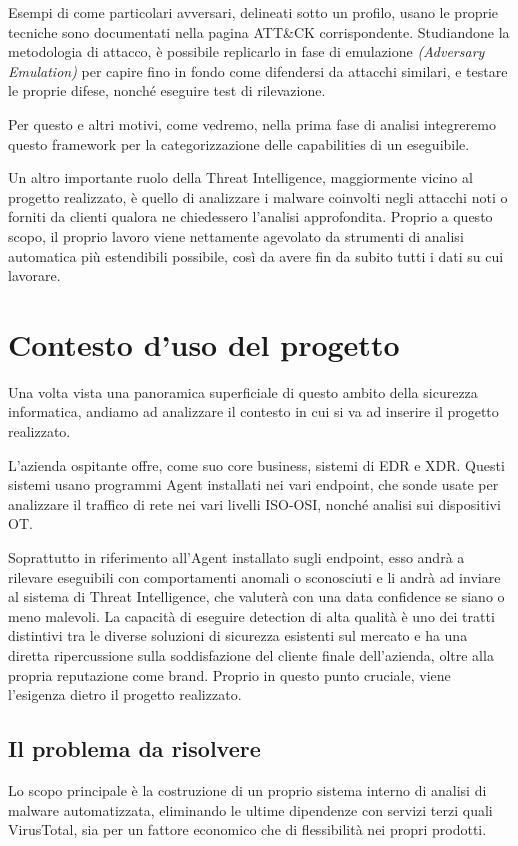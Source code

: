 Esempi di come particolari avversari, delineati sotto un profilo, usano le proprie tecniche sono documentati nella pagina ATT\&CK corrispondente.
Studiandone la metodologia di attacco, è possibile replicarlo in fase di emulazione \emph{(Adversary Emulation)} per capire fino in fondo come difendersi da attacchi similari, e testare le proprie difese, nonché eseguire test di rilevazione.

Per questo e altri motivi, come vedremo, nella prima fase di analisi integreremo questo framework per la categorizzazione delle capabilities di un eseguibile.

\medskip

Un altro importante ruolo della Threat Intelligence, maggiormente vicino al progetto realizzato, è quello di analizzare i malware coinvolti negli attacchi noti o forniti da clienti qualora ne chiedessero l'analisi approfondita. Proprio a questo scopo, il proprio lavoro viene nettamente agevolato da strumenti di analisi automatica più estendibili possibile, così da avere fin da subito tutti i dati su cui lavorare.

\section{Contesto d'uso del progetto}
Una volta vista una panoramica superficiale di questo ambito della sicurezza informatica,
andiamo ad analizzare il contesto in cui si va ad inserire il progetto realizzato.

L'azienda ospitante offre, come suo core business, sistemi di EDR e XDR.
Questi sistemi usano programmi Agent installati nei vari endpoint, che sonde usate per analizzare il traffico di rete nei vari livelli ISO-OSI, nonché analisi sui dispositivi OT.

Soprattutto in riferimento all'Agent installato sugli endpoint, esso andrà a rilevare eseguibili con comportamenti anomali o sconosciuti e li andrà ad inviare al sistema di Threat Intelligence, che valuterà con una data confidence se siano o meno malevoli.
La capacità di eseguire detection di alta qualità è uno dei tratti distintivi tra le diverse soluzioni di sicurezza esistenti sul mercato e ha una diretta ripercussione sulla soddisfazione del cliente finale dell'azienda, oltre alla propria reputazione come brand.
Proprio in questo punto cruciale, viene l'esigenza dietro il progetto realizzato.

\subsection{Il problema da risolvere}
Lo scopo principale è la costruzione di un proprio sistema interno di analisi di malware automatizzata, eliminando le ultime dipendenze con servizi terzi quali VirusTotal, sia per un fattore economico che di flessibilità nei propri prodotti.

